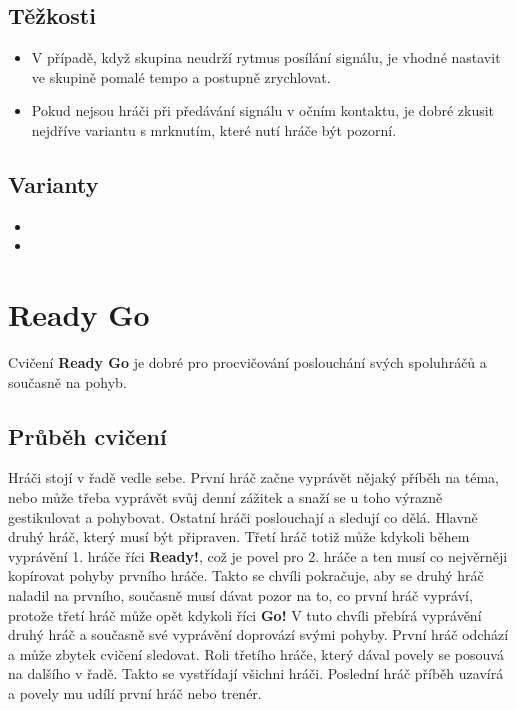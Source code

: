 \subsection{ Těžkosti } \begin{itemize}
\item  V případě, když skupina neudrží rytmus posílání signálu, je vhodné nastavit ve skupině pomalé tempo a postupně zrychlovat.
\item  Pokud nejsou hráči při předávání signálu v očním kontaktu, je dobré zkusit nejdříve variantu s mrknutím, které nutí hráče být pozorní.
\end{itemize}
 
\subsection{Varianty} \begin{itemize}
\item {}
\item {}
\end{itemize}
 
 
 
\needspace{5cm} \section{Ready Go} \label{ready go} Cvičení \textbf{Ready Go}{} je dobré pro procvičování poslouchání svých spoluhráčů a současně na pohyb. 
 
\subsection{ Průběh cvičení } Hráči stojí v řadě vedle sebe. První hráč začne vyprávět nějaký příběh na téma, nebo může třeba vyprávět svůj denní zážitek a snaží se u toho výrazně gestikulovat a pohybovat. Ostatní hráči poslouchají a sledují co dělá. Hlavně druhý hráč, který musí být připraven. Třetí hráč totiž může kdykoli během vyprávění 1. hráče říci \textbf{Ready!}{}, což je povel pro 2. hráče a ten musí co nejvěrněji kopírovat pohyby prvního hráče. Takto se chvíli pokračuje, aby se druhý hráč naladil na prvního, současně musí dávat pozor na to, co první hráč vypráví, protože třetí hráč může opět kdykoli říci \textbf{Go!}{} V tuto chvíli přebírá vyprávění druhý hráč a současně své vyprávění doprovází svými pohyby. První hráč odchází a může zbytek cvičení sledovat. Roli třetího hráče, který dával povely se posouvá na dalšího v řadě. Takto se vystřídají všichni hráči. Poslední hráč příběh uzavírá a povely mu udílí první hráč nebo trenér. 
 
